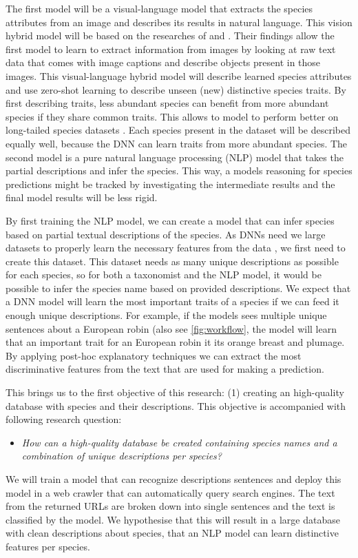 \documentclass[a4paper, 12pt, oneside]{book} %
\begin{document}
The first model will be a visual-language model that extracts the species attributes from an image and describes its results in natural language. 
This vision hybrid model will be based on the researches of \textcite{radford_learning_2021} and \textcite{huang_interpretable_2020}.
Their findings allow the first model to learn to extract information from images by looking at raw text data that comes with image captions and describe objects present in those images.
This visual-language hybrid model will describe learned species attributes and use zero-shot learning to describe unseen (new) distinctive species traits.
By first describing traits, less abundant species can benefit from more abundant species if they share common traits.
This allows to model to perform better on long-tailed species datasets \autocite{van_horn_inaturalist_2018}.
Each species present in the dataset will be described equally well, because the DNN can learn traits from more abundant species.
The second model is a pure natural language processing (NLP) model that takes the partial descriptions and infer the species.
This way, a models reasoning for species predictions might be tracked by investigating the intermediate results \autocite{ishikawa_contextual_2021} and the final model results will be less rigid.

By first training the NLP model, we can create a model that can infer species based on partial textual descriptions of the species. 
As DNNs need we large datasets to properly learn the necessary features from the data \autocite{xue-wen_chen_big_2014, gheisari_survey_2017}, we first need to create this dataset.
This dataset needs as many unique descriptions as possible for each species, so for both a taxonomist and the NLP model, it would be possible to infer the species name based on provided descriptions.
We expect that a DNN model will learn the most important traits of a species if we can feed it enough unique descriptions.
For example, if the models sees multiple unique sentences about a European robin (also see \ref{fig:workflow}, the model will learn that an important trait for an European robin it its orange breast and plumage.
By applying post-hoc explanatory techniques we can extract the most discriminative features from the text that are used for making a prediction.

This brings us to the first objective of this research: (1) creating an high-quality database with species and their descriptions.
This objective is accompanied with following research question:
\begin{itemize}
    \item \emph{How can a high-quality database be created containing species names and a combination of unique descriptions per species?}
\end{itemize}
We will train a model that can recognize descriptions sentences and deploy this model in a web crawler that can automatically query search engines.
The text from the returned URLs are broken down into single sentences and the text is classified by the model.
We hypothesise that this will result in a large database with clean descriptions about species, that an NLP model can learn distinctive features per species.
\end{document}
